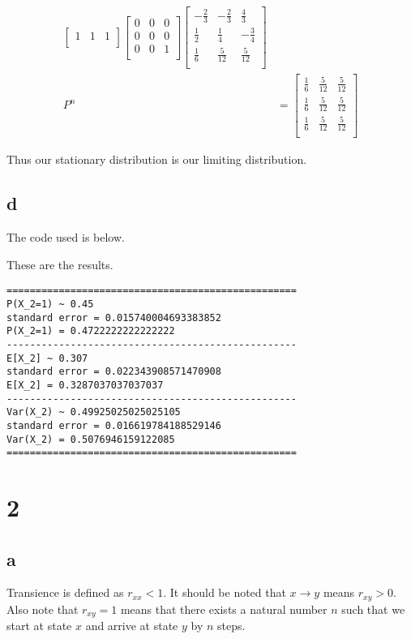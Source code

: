 \documentclass{article}
\begin{document}
\begin{align*}
\begin{bmatrix}
                  1 &  1 & 1 \\
    \end{bmatrix}
    \begin{bmatrix}
        0 & 0 & 0 \\
        0 & 0 & 0 \\
        0 & 0 & 1 \\
    \end{bmatrix}
    \begin{bmatrix}
        -\frac{2}{3} & -\frac{2}{3} & \frac{4}{3} \\
         \frac{1}{2} &  \frac{1}{4} & -\frac{3}{4} \\
         \frac{1}{6} & \frac{5}{12} & \frac{5}{12} \\
    \end{bmatrix} \\
    P^n
    &=
    \begin{bmatrix}
        \frac{1}{6} & \frac{5}{12} & \frac{5}{12} \\
        \frac{1}{6} & \frac{5}{12} & \frac{5}{12} \\
        \frac{1}{6} & \frac{5}{12} & \frac{5}{12} \\
    \end{bmatrix}
\end{align*}

Thus our stationary distribution is our limiting distribution.

\subsection{d}
The code used is below.


These are the results.
\begin{verbatim}
==================================================
P(X_2=1) ~ 0.45
standard error = 0.015740004693383852
P(X_2=1) = 0.4722222222222222
--------------------------------------------------
E[X_2] ~ 0.307
standard error = 0.022343908571470908
E[X_2] = 0.3287037037037037
--------------------------------------------------
Var(X_2) ~ 0.49925025025025105
standard error = 0.016619784188529146
Var(X_2) = 0.5076946159122085
==================================================
\end{verbatim}

\section{2}
\subsection{a}
Transience is defined as $r_{xx} < 1$. It should be noted that $x \to y$ means
$r_{xy} > 0$. Also note that $r_{xy} = 1$ means that there exists a
natural number $n$ such that we start at state $x$ and arrive at state $y$ by
$n$ steps.
\end{document}
